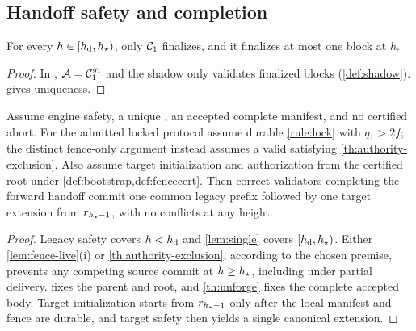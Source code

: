 \subsection{Handoff safety and completion}
\begin{lemma}
\label{lem:single}
For every $h\in[h_{\mathrm d},h_{\star})$, only $\mathcal{C}_1$ finalizes, and it finalizes at most one block at $h$.
\end{lemma}
\begin{proof}
In , $\mathcal{A}=\mathcal{C}_1^{g_1}$ and the shadow only validates finalized blocks
(\cref{def:shadow}).  gives uniqueness.
\end{proof}

\begin{theorem}
\label{th:safety}
Assume engine safety, a unique \CutCert, an accepted complete manifest, and no certified abort.
For the admitted locked protocol assume durable \cref{rule:lock} with $q_1>2f$;
the distinct fence-only argument instead assumes a valid \FenceCert{} satisfying
\cref{th:authority-exclusion}. Also assume target initialization and authorization from the
certified root under \cref{def:bootstrap,def:fencecert}. Then correct validators completing the
forward handoff commit one common legacy prefix followed by one target extension from
$r_{h_{\star}-1}$, with no conflicts at any height.
\end{theorem}
\begin{proof}
Legacy safety covers $h<h_{\mathrm d}$ and \cref{lem:single} covers $[h_{\mathrm d},h_{\star})$. Either
\cref{lem:fence-live}(i) or \cref{th:authority-exclusion}, according to the chosen premise,
prevents any competing source commit at $h\ge h_{\star}$, including under partial delivery.
 fixes the parent and root, and \cref{th:unforge} fixes the complete accepted body.
Target initialization starts from $r_{h_{\star}-1}$ only after the local manifest and fence are durable, and
target safety then yields a single canonical extension.
\end{proof}

